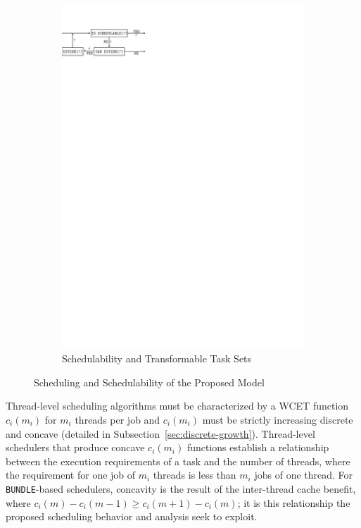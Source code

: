 \documentclass[a4paper,UKenglish,cleveref,autoref,english]{lipics-v2019}
\begin{document}
\begin{figure}[b]
\begin{subfigure}{.58\linewidth}
    \includegraphics[width=\linewidth]{process}  
    \caption{Schedulability and Transformable Task Sets}
    \label{fig:process}
  \end{subfigure}
  \caption{Scheduling and Schedulability of the Proposed Model}
\end{figure}

Thread-level scheduling algorithms must be characterized by a WCET
function ${c_i(m_i)}$ for ${m_i}$ threads per job and ${c_i(m_i)}$ must be
strictly increasing discrete and concave (detailed in
Subsection~\ref{sec:discrete-growth}). Thread-level schedulers that
produce concave ${c_i(m_i)}$ functions establish a relationship
between the execution requirements of a task and the number of
threads, where the requirement for one job of ${m_i}$ threads is less
than ${m_i}$ jobs of one thread. For \texttt{BUNDLE}-based schedulers,
concavity is the result of the inter-thread cache benefit, where
${c_i(m) - c_i(m - 1) \ge c_i(m+1) - c_i(m)}$; it is this
relationship the proposed scheduling behavior and analysis seek
to exploit.
\end{document}
